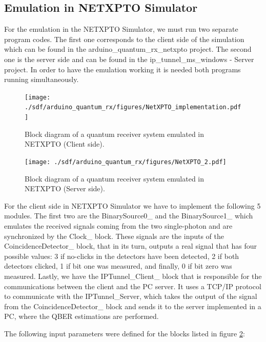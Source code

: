 \begin{refsection}
\begin{figure}[H]
	\end{figure}


		
	\subsection{Emulation in NETXPTO Simulator}
	
For the emulation in the NETXPTO Simulator, we must run two separate program codes. The first one corresponds to the client side of the simulation which can be found in the arduino\_quantum\_rx\_netxpto project. The second one is the server side and can be found in the ip\_tunnel\_ms\_windows - Server project. In order to have the emulation working it is needed both programs running simultaneously.
	
	
	
	\begin{figure}[H]
		\centering
		\texttt{[image: ./sdf/arduino\_quantum\_rx/figures/NetXPTO\_implementation.pdf]}
		\caption{Block diagram of a quantum receiver system emulated in NETXPTO (Client side).}
		
		\label{fig:netxpto}
	\end{figure}

	\begin{figure}[H]
		\centering
		\texttt{[image: ./sdf/arduino\_quantum\_rx/figures/NetXPTO\_2.pdf]}
		\caption{Block diagram of a quantum receiver system emulated in NETXPTO (Server side).}
		\label{fig:netxpto}
	\end{figure}
	
	 For the client side in NETXPTO Simulator we have to implement the following 5 modules. The first two are the BinarySource0\_ and the BinarySource1\_ which emulates the received signals coming from the two single-photon and are synchronized by the Clock\_ block. These signals are the inputs of the CoincidenceDetector\_ block, that in its turn, outputs a real signal that has four possible values: 3 if no-clicks in the detectors have been detected, 2 if both detectors clicked, 1 if bit one was measured, and finally, 0 if bit zero was measured. Lastly, we have the IPTunnel\_Client\_ block that is responsible for the communications between the client and the PC server. It uses a TCP/IP protocol to communicate with the IPTunnel\_Server, which takes the output of the signal from the CoincidenceDetector\_ block and sends it to the server implemented in a PC, where the QBER estimations are performed.

	The following input parameters were defined for the blocks listed in figure \ref{fig:netxpto}: 
	

\end{refsection}
